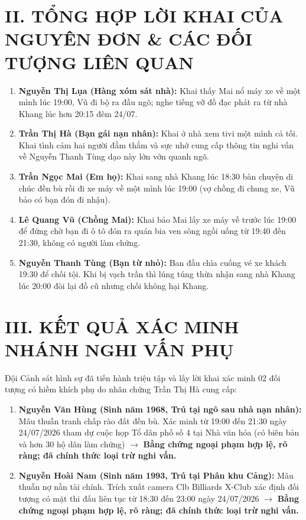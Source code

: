 \documentclass[12pt,a4paper]{article}
\begin{document}
\section*{II. TỔNG HỢP LỜI KHAI CỦA NGUYÊN ĐƠN \& CÁC ĐỐI TƯỢNG LIÊN QUAN}
\begin{enumerate}[label=\arabic*., leftmargin=1.5cm]
    \item \textbf{Nguyễn Thị Lụa (Hàng xóm sát nhà):} Khai thấy Mai nổ máy xe về một mình lúc 19:00, Vũ đi bộ ra đầu ngõ; nghe tiếng vỡ đồ đạc phát ra từ nhà Khang lúc hơn 20:15 đêm 24/07.
    \item \textbf{Trần Thị Hà (Bạn gái nạn nhân):} Khai ở nhà xem tivi một mình cả tối. Khai tình cảm hai người đằm thắm và sực nhớ cung cấp thông tin nghi vấn về Nguyễn Thanh Tùng dạo này lởn vởn quanh ngõ.
    \item \textbf{Trần Ngọc Mai (Em họ):} Khai sang nhà Khang lúc 18:30 bàn chuyện di chúc đền bù rồi đi xe máy về một mình lúc 19:00 (vợ chồng đi chung xe, Vũ bảo có bạn đón đi nhậu).
    \item \textbf{Lê Quang Vũ (Chồng Mai):} Khai bảo Mai lấy xe máy về trước lúc 19:00 để đứng chờ bạn đi ô tô đón ra quán bia ven sông ngồi uống từ 19:40 đến 21:30, không có người làm chứng.
    \item \textbf{Nguyễn Thanh Tùng (Bạn từ nhỏ):} Ban đầu chìa cuống vé xe khách 19:30 để chối tội. Khi bị vạch trần thì lúng túng thừa nhận sang nhà Khang lúc 20:00 đòi lại đồ cũ nhưng chối không hại Khang.
\end{enumerate}

\section*{III. KẾT QUẢ XÁC MINH NHÁNH NGHI VẤN PHỤ}
Đội Cảnh sát hình sự đã tiến hành triệu tập và lấy lời khai xác minh 02 đối tượng có hiềm khích phụ do nhân chứng Trần Thị Hà cung cấp:
\begin{enumerate}[label=\arabic*., leftmargin=1.5cm]
    \item \textbf{Nguyễn Văn Hùng (Sinh năm 1968, Trú tại ngõ sau nhà nạn nhân):} Mâu thuẫn tranh chấp rào đất đền bù. Xác minh từ 19:00 đến 21:30 ngày 24/07/2026 tham dự cuộc họp Tổ dân phố số 4 tại Nhà văn hóa (có biên bản và hơn 30 hộ dân làm chứng) $\rightarrow$ \textbf{Bằng chứng ngoại phạm hợp lệ, rõ ràng; đã chính thức loại trừ nghi vấn.}
    \item \textbf{Nguyễn Hoài Nam (Sinh năm 1993, Trú tại Phân khu Cảng):} Mâu thuẫn nợ nần tài chính. Trích xuất camera Clb Billiards X-Club xác định đối tượng có mặt thi đấu liên tục từ 18:30 đến 23:00 ngày 24/07/2026 $\rightarrow$ \textbf{Bằng chứng ngoại phạm hợp lệ, rõ ràng; đã chính thức loại trừ nghi vấn.}
\end{enumerate}
\end{document}

